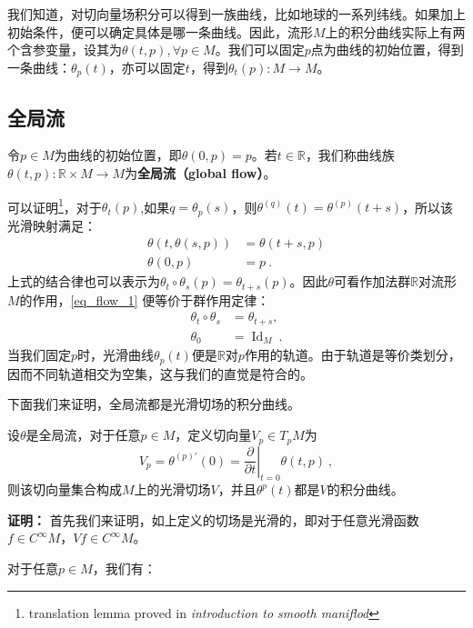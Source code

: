 我们知道，对切向量场积分可以得到一族曲线，比如地球的一系列纬线。如果加上初始条件，便可以确定具体是哪一条曲线。因此，流形$M$上的积分曲线实际上有两个含参变量，设其为$\theta(t,p),\forall p\in M$。我们可以固定$p$点为曲线的初始位置，得到一条曲线：$\theta_p(t)$，亦可以固定$t$，得到$\theta_t(p):M\rightarrow M$。
\subsection{全局流}
令$p\in M$为曲线的初始位置，即$\theta(0,p)=p$。若$t\in\mathbb R$，我们称曲线族$\theta(t,p):\mathbb R\times M\rightarrow M$为\textbf{全局流（global flow）}。

可以证明\footnote{translation lemma proved in \textsl{introduction to smooth maniflod}}，对于$\theta_t(p)$,如果$q=\theta_p(s)$，则$\theta^{(q)}(t)=\theta^{(p)}(t+s)$，所以该光滑映射满足：
\begin{equation}\label{eq_flow_1}
\begin{aligned}
\theta(t, \theta(s, p)) & =\theta(t+s, p) \\
\theta(0, p) & =p~.
\end{aligned}
\end{equation}
上式的结合律也可以表示为$\theta_t \circ \theta_s(p)=\theta_{t+s}(p)$。因此$\theta$可看作加法群$\mathbb R$对流形$M$的作用，\autoref{eq_flow_1} 便等价于群作用定律：
\begin{equation}
\begin{aligned}
\theta_t \circ \theta_s & =\theta_{t+s}, \\
\theta_0 & =\operatorname{Id}_M~.
\end{aligned}
\end{equation}
当我们固定$p$时，光滑曲线$\theta_p(t)$便是$\mathbb R$对$p$作用的轨道。由于轨道是等价类划分，因而不同轨道相交为空集，这与我们的直觉是符合的。

下面我们来证明，全局流都是光滑切场的积分曲线。
\begin{theorem}{}
设$\theta$是全局流，对于任意$p\in M$，定义切向量$V_p\in T_p M$为
\begin{equation}
V_p=\theta^{(p) \prime}(0)=\left.\frac{\partial}{\partial t}\right|_{t=0} \theta(t, p) ~,
\end{equation}
则该切向量集合构成$M$上的光滑切场$V$，并且$\theta^p(t)$都是$V$的积分曲线。
\end{theorem}
\textbf{证明：}
首先我们来证明，如上定义的切场是光滑的，即对于任意光滑函数$f\in C^{\infty}M$，$Vf\in C^{\infty}M$。

对于任意$p\in M$，我们有：

